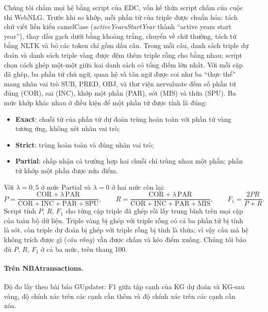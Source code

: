 Chúng tôi chấm mọi hệ bằng script của EDC, vốn kế thừa script chấm của cuộc thi WebNLG.
Trước khi so khớp, mỗi phần tử của triple được chuẩn hóa: tách chữ viết liền kiểu camelCase (\textit{activeYearsStartYear} thành ``active years start year''), thay dấu gạch dưới bằng khoảng trắng, chuyển về chữ thường, tách từ bằng NLTK và bỏ các token chỉ gồm dấu câu.
Trong mỗi câu, danh sách triple dự đoán và danh sách triple vàng được đệm thêm triple rỗng cho bằng nhau; script chọn cách ghép một-một giữa hai danh sách có tổng điểm lớn nhất.
Với mỗi cặp đã ghép, ba phần tử chủ ngữ, quan hệ và tân ngữ được coi như ba ``thực thể'' mang nhãn vai trò SUB, PRED, OBJ, và thư viện nervaluate đếm số phần tử đúng (COR), sai (INC), khớp một phần (PAR), sót (MIS) và thừa (SPU).
Ba mức khớp khác nhau ở điều kiện để một phần tử được tính là đúng:
\begin{itemize}
  \item \textbf{Exact}: chuỗi từ của phần tử dự đoán trùng hoàn toàn với phần tử vàng tương ứng, không xét nhãn vai trò;
  \item \textbf{Strict}: trùng hoàn toàn và đúng nhãn vai trò;
  \item \textbf{Partial}: chấp nhận cả trường hợp hai chuỗi chỉ trùng nhau một phần; phần tử khớp một phần được nửa điểm.
\end{itemize}
Với $\lambda = 0{,}5$ ở mức Partial và $\lambda = 0$ ở hai mức còn lại:
\begin{equation}
P = \frac{\mathrm{COR} + \lambda\,\mathrm{PAR}}{\mathrm{COR} + \mathrm{INC} + \mathrm{PAR} + \mathrm{SPU}}, \qquad
R = \frac{\mathrm{COR} + \lambda\,\mathrm{PAR}}{\mathrm{COR} + \mathrm{INC} + \mathrm{PAR} + \mathrm{MIS}}, \qquad
F_1 = \frac{2PR}{P + R}.
\end{equation}
Script tính $P$, $R$, $F_1$ cho từng cặp triple đã ghép rồi lấy trung bình trên mọi cặp của toàn bộ dữ liệu.
Triple vàng bị ghép với triple rỗng có cả ba phần tử bị tính là sót, còn triple dự đoán bị ghép với triple rỗng bị tính là thừa; vì vậy câu mà hệ không trích được gì (\textit{câu rỗng}) vẫn được chấm và kéo điểm xuống.
Chúng tôi báo đủ $P$, $R$, $F_1$ ở cả ba mức, trên thang 100.

\paragraph*{Trên NBAtransactions.}
Độ đo lấy theo bài báo GUpdater: F1 giữa tập cạnh của KG dự đoán và KG-sau vàng, độ chính xác trên các cạnh cần thêm và độ chính xác trên các cạnh cần xóa.

